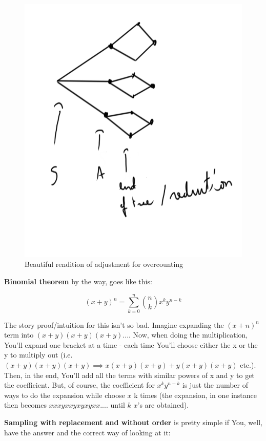 \documentclass{article}
\begin{document}
			\begin{figure}[H]
				\caption{Beautiful rendition of adjustment for overcounting}
				\includegraphics[scale=0.25]{visual_adjustment_for_overcounting}
			\end{figure}
		
		\textbf{Binomial theorem} by the way, goes like this:
		
		$$ (x+y)^n = \sum^n_{k=0} \binom{n}{k} x^ky^{n-k} $$
		
		The story proof/intuition for this isn't so bad. Imagine expanding the $(x+n)^n$ term into $(x+y)(x+y)(x+y)...$. Now, when doing the multiplication, You'll expand one bracket at a time - each time You'll choose either the x or the y to multiply out (i.e. $(x+y)(x+y)(x+y) \implies x(x+y)(x+y) + y(x+y)(x+y)$ etc.). Then, in the end, You'll add all the terms with similar powers of x and y to get the coefficient. But, of course, the coefficient for $x^ky^{n-k}$ is just the number of ways to do the expansion while choose $x$ k times (the expansion, in one instance then becomes $xxxyxxyxyxyxx....$ until $k$ $x$'s are obtained).
		
		\textbf{Sampling with replacement and without order} is pretty simple if You, well, have the answer and the correct way of looking at it:
		
\end{document}
